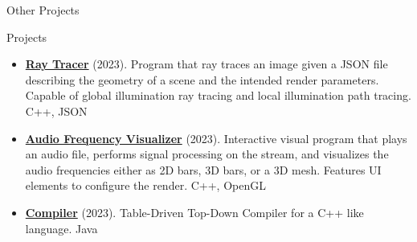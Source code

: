\documentclass[]{mcdowellcv}
\begin{document}
	\begin{cvsection}{Other Projects}
		\begin{cvsubsection}{Projects}{}{}
			\begin{itemize}
				\item \textbf{\href{https://github.com/adrientremblay/RayTracer}{Ray Tracer}} (2023). Program that ray traces an image given a JSON file describing the geometry of a scene and the intended render parameters. Capable of global illumination ray tracing and local illumination path tracing. C++, JSON 
                \item \textbf{\href{https://github.com/adrientremblay/AudioVisualizer}{Audio Frequency Visualizer}} (2023). Interactive visual program that plays an audio file, performs signal processing on the stream, and visualizes the audio frequencies either as 2D bars, 3D bars, or a 3D mesh. Features UI elements to configure the render. C++, OpenGL 
                \item \textbf{\href{https://github.com/adrientremblay/Compiler}{Compiler}} (2023). Table-Driven Top-Down Compiler for a C++ like language. Java
			\end{itemize}
		\end{cvsubsection}
	\end{cvsection}
	
\end{document}

